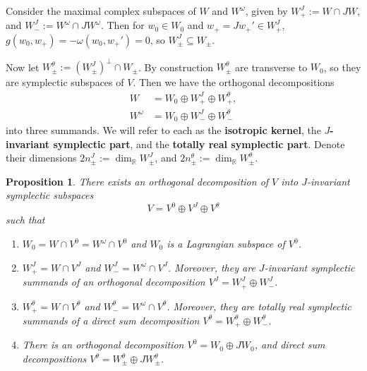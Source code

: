 \documentclass[12pt, final]{article}
\def\R{\mathbb{R}}
\newtheorem{proposition}[theorem]{Proposition}
\begin{document}
Consider the maximal complex subspaces of $W$ and $W^\omega$, given by $W_+^J := W \cap JW$, and $W_-^J := W^\omega \cap JW^\omega$.
Then for $w_0 \in W_0$ and $w_+ = Jw_+' \in W_+^J$, $g(w_0, w_+) = -\omega(w_0, w_+') = 0$, so $W_\pm^J \subseteq W_\pm$.

Now let $W_\pm^\theta:= (W_\pm^J)^\perp \cap W_\pm$. By construction $W_\pm^\theta$ are transverse to $W_0$, so they are symplectic subspaces of $V$. Then we have the orthogonal decompositions
\begin{align*} W &= W_0 \oplus W_+^J \oplus W_+^\theta, \\ W^\omega &= W_0 \oplus W_-^J \oplus W_-^\theta \end{align*}
into three summands. We will refer to each as the \textbf{isotropic kernel}, the \textbf{$J$-invariant symplectic part}, and the \textbf{totally real symplectic part}. Denote their dimensions $2n_{\pm}^J := \dim_\R W_\pm^J$, and $2n_{\pm}^\theta := \dim_\R W_\pm^\theta$.

\begin{proposition} \label{prop:kahler_splittings}
There exists an orthogonal decomposition of $V$ into $J$-invariant symplectic subspaces
\[ V = V^0 \oplus V^J \oplus V^\theta\]
such that
\begin{enumerate}
    \item $W_0 = W \cap V^0 = W^\omega \cap V^0$ and $W_0$ is a Lagrangian subspace of $V^0$.
    \item $W_+^J = W \cap V^J$ and $W_-^J = W^\omega\cap V^J$. Moreover, they are $J$-invariant symplectic summands of an orthogonal decomposition $V^J = W_+^J \oplus W_-^J$.
    \item $W_+^\theta = W \cap V^\theta$ and $W_-^\theta = W^\omega \cap V^\theta$.  Moreover, they are totally real symplectic summands of a direct sum decomposition $V^\theta = W_+^\theta \oplus W_-^\theta$.
    \item There is an orthogonal decomposition $V^0 = W_0 \oplus JW_0$, and direct sum decompositions $V^\theta = W_\pm^\theta \oplus JW_\pm^\theta$.
\end{enumerate}

\end{proposition}
\end{document}
